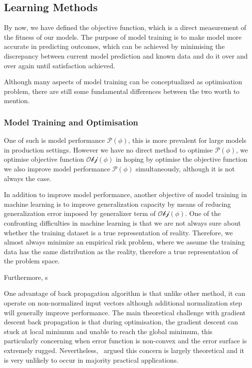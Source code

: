 \subsection {Learning Methods}
By now, we have defined the objective function, which is a direct measurement of the fitness of our models. The purpose of model training is to make model more accurate in predicting outcomes, which can be achieved by minimising the discrepancy between current model prediction and known data and do it over and over again until satisfaction achieved. 
\par 
Although many aspects of model training can be conceptualized as optimisation problem, there are still some fundamental differences between the two worth to mention. 
\par 
\subsubsection{Model Training and Optimisation}
One of such is model performance $\mathcal{P}(\phi)$, this is more prevalent for large models in production settings. However we have no direct method to optimise $\mathcal{P}(\phi)$, we optimise objective function $\mathcal{Obj}(\phi)$ in hoping by optimise the objective function we also improve model performance $\mathcal{P}(\phi)$ simultaneously, although it is not always the case.
\par 
In addition to improve model performance, another objective of model training in machine learning is to improve generalization capacity by means of reducing generalization error imposed by generalizer term of $\mathcal{Obj}(\phi)$. One of the confronting difficulties in machine learning is that we are not always sure about whether the training dataset is a true representation of reality. Therefore, we almost always minimize an empirical risk problem, where we assume the training data has the same distribution as the reality, therefore a true representation of the problem space. 
\par
Furthermore, s

One advantage of back propagation algorithm is that unlike other method, it can operate on non-normalized input vectors although additional normalization step will generally improve performance. \cite{Buckland:2002} The main theoretical challenge with gradient descent back propagation is that during optimisation, the gradient descent can stuck at local minimum and unable to reach the global minimum, this particularly concerning when error function is non-convex and the error surface is extremely rugged. Nevertheless,~\citet{LeCun_2015} argued this concern is largely theoretical and it is very unlikely to occur in majority practical applications. 